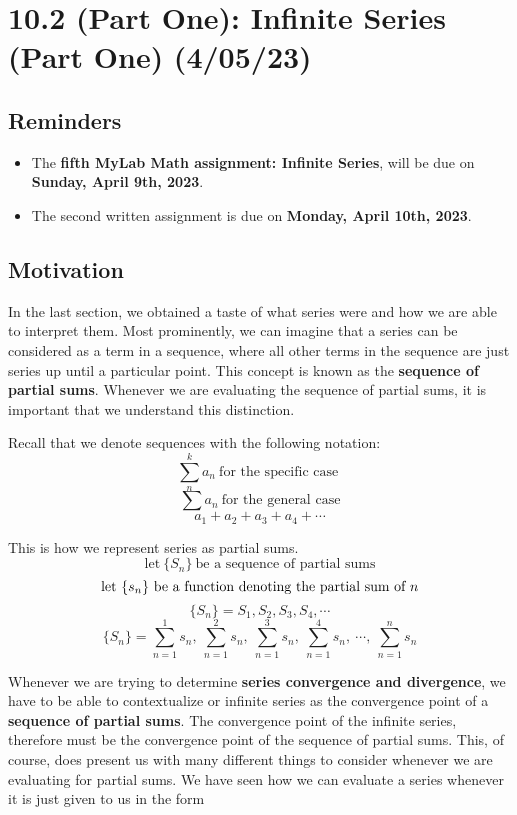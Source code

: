 \documentclass{report}
\begin{document}
\begin{sloppypar}
\chapter{10.2 (Part One): Infinite Series (Part One) (4/05/23)}
\section{Reminders}
\begin{itemize}
  \item The \textbf{fifth MyLab Math assignment: Infinite Series}, will be due on
        \textbf{Sunday, April 9th, 2023}.

  \item The second written assignment is due on \textbf{
        Monday, April 10th, 2023}.
\end{itemize}

\section{Motivation}
In the last section, we obtained a taste of what
series were and how we are able to interpret them. Most
prominently, we can imagine that a series can be considered
as a term in a sequence, where all other terms in the
sequence are just series up until a particular point.
This concept is known as the \textbf{sequence of partial
  sums}. Whenever we are evaluating the sequence of partial
sums, it is important that we understand this distinction.

\par Recall that we denote sequences with the following notation:
\[ \sum_{n}^{k} a_{n} ~\textrm{for the specific case }\]
\[ \sum a_{n} ~\textrm{for the general case}\]
\[ a_{1} + a_{2} + a_{3} + a_{4} + \cdots \]

\par This is how we represent series as partial sums.
\[ \textrm{let} ~ \{ S_{n}\} ~\textrm{be a sequence of partial sums}\]
\[ \textrm{let} ~ \{ s_{n}\} ~\textrm{be a function denoting the partial sum of $ n $}\]
\[ \{S_{n}\} = S_{1}, S_{2}, S_{3}, S_{4}, \cdots \]
\[ \{S_{n}\} = \sum_{n=1}^{1} s_{n},~ \sum_{n=1}^{2} s_{n},~
  \sum_{n=1}^{3} s_{n},~ \sum_{n=1}^{4} s_{n}, ~\cdots, ~ \sum_{n=1}^{n} s_{n}\]

\par Whenever we are trying to determine \textbf{series convergence and divergence},
we have to be able to contextualize or infinite series as the convergence
point of a \textbf{sequence of partial sums}. The convergence point of the
infinite series, therefore must be the convergence point of the
sequence of partial sums. This, of course, does present us with many
different things to consider whenever we are evaluating for partial sums. We have
seen how we can evaluate a series whenever it is just given to us in the form


\end{sloppypar}
\end{document}
